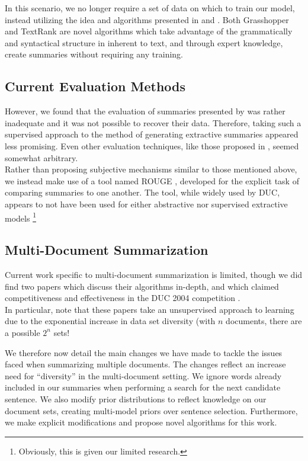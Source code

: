\documentclass[11pt]{article}
\begin{document}
In this scenario, we no longer require a set of data on which to train our model, instead utilizing the idea and algorithms presented in \cite{grasshopper} and \cite{textrank}. Both {\sc Grasshopper} and {\sc TextRank} are novel algorithms which take advantage of the grammatically and syntactical structure in inherent to text, and through expert knowledge, create summaries without requiring any training.

\subsection{Current Evaluation Methods}
However, we found that the evaluation of summaries presented by \cite{hmm_summary} was rather inadequate and it was not possible to recover their data. Therefore, taking such a supervised approach to the method of generating extractive summaries appeared less promising. Even other evaluation techniques, like those proposed in \cite{survey}, seemed somewhat arbitrary. \\

Rather than proposing subjective mechanisms similar to those mentioned above, we instead make use of a tool named ROUGE \cite{rouge}, developed for the explicit task of comparing summaries to one another. The tool, while widely used by DUC, appears to not have been used for either abstractive nor supervised extractive models \footnote{Obviously, this is given our limited research.}

\subsection{Multi-Document Summarization}
Current work specific to multi-document summarization is limited, though we did find two papers which discuss their algorithms in-depth, and which claimed competitiveness and effectiveness in the DUC 2004 competition \cite{grasshopper} \cite{textrank}.\\

In particular, note that these papers take an unsupervised approach to learning due to the exponential increase in data set diversity (with $n$ documents, there are a possible $2^n$ sets!

We therefore now detail the main changes we have made to tackle the issues faced when summarizing multiple documents. The changes reflect an increase need for “diversity” in the multi-document setting. We ignore words already included in our summaries when performing a search for the next candidate sentence. We also modify prior distributions to reflect knowledge on our document sets, creating multi-model priors over sentence selection. Furthermore, we make explicit modifications and propose novel algorithms for this work.
\end{document}
